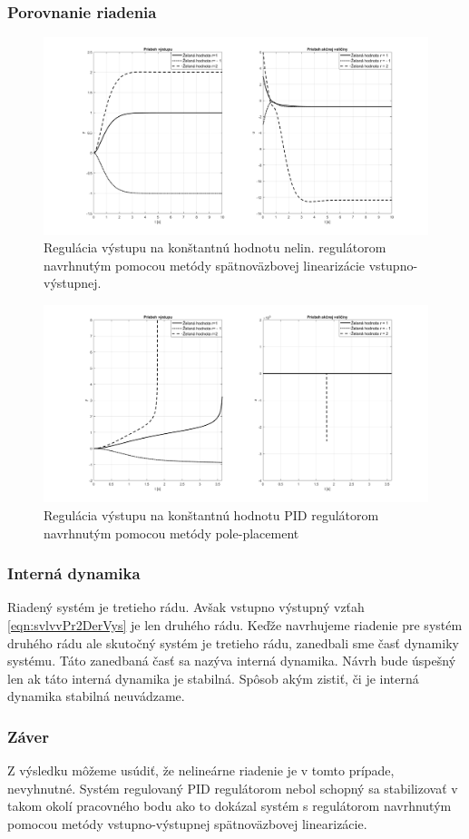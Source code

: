 \documentclass[../main.tex]{subfiles}
\begin{document}
	\subsubsection{Porovnanie riadenia}	
	\begin{figure}[h!]
		\centering
		\includegraphics[width=\linewidth]{pr2vys}
		\caption{Regulácia výstupu na konštantnú hodnotu nelin. regulátorom navrhnutým pomocou metódy spätnoväzbovej linearizácie vstupno-výstupnej.}
		\label{fig:svlvvPr2Vys}
	\end{figure}
	\begin{figure}[h!]
		\centering
		\includegraphics[width=\linewidth]{pr2vysPID}
		\caption{Regulácia výstupu na konštantnú hodnotu PID regulátorom navrhnutým pomocou metódy pole-placement}
		\label{fig:svlvvPr2VysPID}
	\end{figure}
	\newpage
    \subsubsection{Interná dynamika}
    Riadený systém je tretieho rádu. Avšak vstupno výstupný vzťah \cref{eqn:svlvvPr2DerVys} je len druhého rádu. Keďže navrhujeme riadenie pre systém druhého rádu ale skutočný systém je tretieho rádu, zanedbali sme časť dynamiky systému. Táto zanedbaná časť sa nazýva interná dynamika. Návrh bude úspešný len ak táto interná dynamika je stabilná. Spôsob akým zistiť, či je interná dynamika stabilná neuvádzame.
	\subsubsection{Záver}
	Z výsledku môžeme usúdiť, že nelineárne riadenie je v tomto prípade, nevyhnutné. Systém regulovaný PID regulátorom nebol schopný sa stabilizovať v takom okolí pracovného bodu ako to dokázal systém s regulátorom navrhnutým pomocou metódy vstupno-výstupnej spätnoväzbovej linearizácie. 
\end{document}
